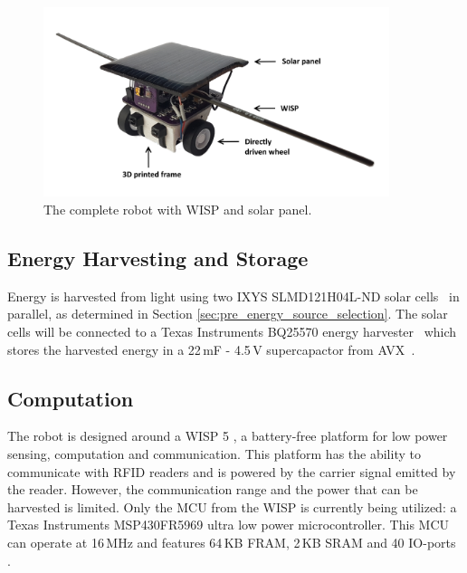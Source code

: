 \begin{figure}[h!]
	\centering
	\includegraphics[width=0.9\textwidth]{pics/tp_robot2.png}
	\caption{The complete robot with WISP and solar panel.}
	\label{fig:robot_picture}
\end{figure}

\subsection{Energy Harvesting and Storage}
Energy is harvested from light using two IXYS SLMD121H04L-ND solar cells~\cite{ixolar_slmd121h04l_2017} in parallel, as determined in Section \ref{sec:pre_energy_source_selection}.
The solar cells will be connected to a Texas Instruments BQ25570 energy harvester~\cite{bq25570_2017} which stores the harvested energy in a 22\,mF - 4.5\,V supercapactor from AVX~\cite{avx_bestcap_2017}.

\subsection{Computation}
\label{sec:dai_computation}

The robot is designed around a WISP 5 \cite{wisp5_wiki_2017}, a battery-free platform for low power sensing, computation and communication.
This platform has the ability to communicate with RFID readers and is powered by the carrier signal emitted by the reader.
However, the communication range and the power that can be harvested is limited. 
Only the MCU from the WISP is currently being utilized: a Texas Instruments MSP430FR5969 ultra low power microcontroller.
This MCU can operate at 16\,MHz and features 64\,KB FRAM, 2\,KB SRAM and 40 IO-ports \cite{msp430fr5969_2017}.


